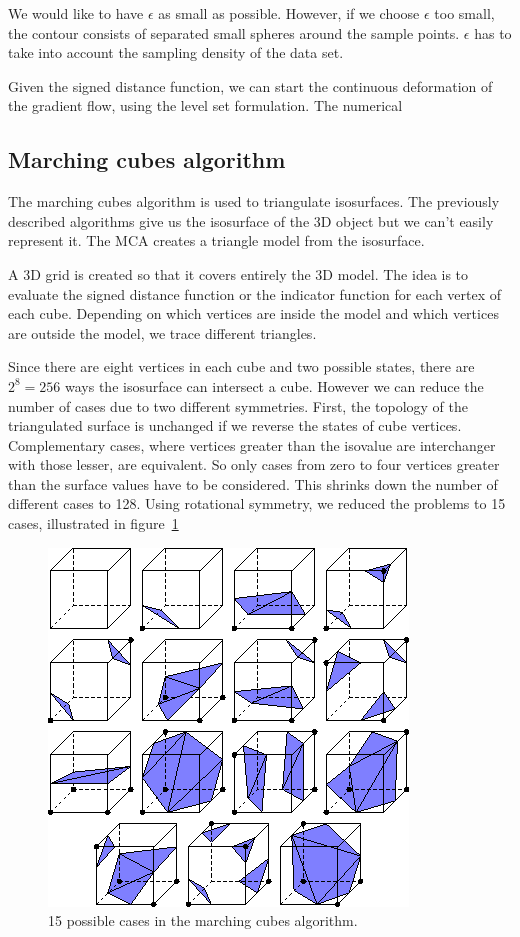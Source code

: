 \documentclass[12pt]{article}
\begin{document}
We would like to have $\epsilon$ as small as possible. However, if we choose $\epsilon$ too small, the contour consists of separated small spheres around the sample points. $\epsilon$ has to take into account the sampling density of the data set.

Given the signed distance function, we can start the continuous deformation of the gradient flow, using the level set formulation. The numerical %


\subsection{Marching cubes algorithm}
\label{subsec:mca}
The marching cubes algorithm is used to triangulate isosurfaces. The previously described algorithms give us the isosurface of the 3D object but we can't easily represent it. The MCA creates a triangle model from the isosurface.

A 3D grid is created so that it covers entirely the 3D model. The idea is to evaluate the signed distance function or the indicator function for each vertex of each cube. Depending on which vertices are inside the model and which vertices are outside the model, we trace different triangles.

Since there are eight vertices in each cube and two possible states, there are $2^8 = 256$ ways the isosurface can intersect a cube. However we can reduce the number of cases due to two different symmetries. First, the topology of the triangulated surface is unchanged if we reverse the states of cube vertices. Complementary cases, where vertices greater than the isovalue are interchanger with those lesser, are equivalent. So only cases from zero to four vertices greater than the surface values have to be considered. This shrinks down the number of different cases to 128. Using rotational symmetry, we reduced the problems to 15 cases, illustrated in figure~\ref{mcCases}

\begin{figure}[h]
  \centering
  \includegraphics[scale=0.7]{mcCases.png}
  \caption{\label{mcCases} 15 possible cases in the marching cubes algorithm.
}
\end{figure}
\end{document}
